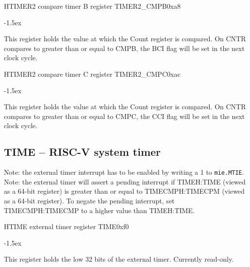 \documentclass[12pt]{article}
\begin{document}
\begin{register}{H}{TIMER2 compare timer B register TIMER2\_CMPB}{0xa8}
\label{timer2cmpb}
%
%
\regnewline%
\end{register}
\begin{regdesc}[0.8\textwidth]\begin{reglist}[00000]
\itemsep-1.5ex
\item[CMPB] This register holds the value at which the Count register is compared. On CNTR compares to greater than or equal to CMPB, the BCI flag will be set in the next clock cycle.
\end{reglist}\end{regdesc}

\begin{register}{H}{TIMER2 compare timer C register TIMER2\_CMPC}{0xac}
\label{timer2cmpc}
%
%
\regnewline%
\end{register}
\begin{regdesc}[0.8\textwidth]\begin{reglist}[00000]
\itemsep-1.5ex
\item[CMPC] This register holds the value at which the Count register is compared. On CNTR compares to greater than or equal to CMPC, the CCI flag will be set in the next clock cycle.
\end{reglist}\end{regdesc}

\subsection{TIME -- RISC-V system timer}
Note: the external timer interrupt has to be enabled by writing a 1 to \lstinline[breaklines=false]|mie.MTIE|.
Note: the external timer will assert a pending interrupt if TIMEH:TIME (viewed as a 64-bit register) is greater than or equal to TIMECMPH:TIMECPM (viewed as a 64-bit register). To negate the pending interrupt, set TIMECMPH:TIMECMP to a higher value than TIMEH:TIME.

\begin{register}{H}{TIME external timer register TIME}{0xf0}
\label{time}
%
\regnewline%
\end{register}
\begin{regdesc}[0.8\textwidth]\begin{reglist}[00000]
\itemsep-1.5ex
\item [TIME] This register holds the low 32 bits of the external timer. Currently read-only.
\end{reglist}\end{regdesc}
\end{document}
